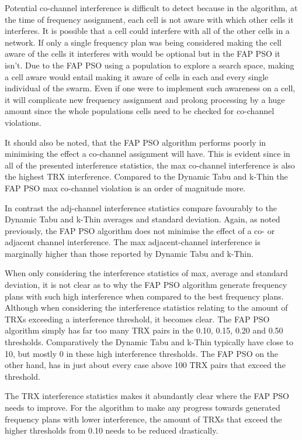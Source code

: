 Potential co-channel interference is difficult to detect because in the algorithm, at the time of frequency assignment, each cell is not aware with which other cells it interferes. It is possible that a cell could interfere with all of the other cells in a network. If only a single frequency plan was being considered making the cell aware of the cells it interferes with would be optional but in the FAP PSO it isn't. Due to the FAP PSO using a population to explore a search space, making a cell aware would entail making it aware of cells in each and every single individual of the swarm. Even if one were to implement such awareness on a cell, it will complicate new frequency assignment and prolong processing by a huge amount since the whole populations cells need to be checked for co-channel violations.

It should also be noted, that the FAP PSO algorithm performs poorly in minimising the effect a co-channel assignment will have. This is evident since in all of the presented interference statistics, the max co-channel interference is also the highest TRX interference. Compared to the Dynamic Tabu and k-Thin the FAP PSO max co-channel violation is an order of magnitude more.

In contrast the adj-channel interference statistics compare favourably to the Dynamic Tabu and k-Thin averages and standard deviation. Again, as noted previously, the FAP PSO algorithm does not minimise the effect of a co- or adjacent channel interference. The max adjacent-channel interference is marginally higher than those reported by Dynamic Tabu and k-Thin.

When only considering the interference statistics of max, average and standard deviation, it is not clear as to why the FAP PSO algorithm generate frequency plans with such high interference when compared to the best frequency plans. Although when considering the interference statistics relating to the amount of TRXs exceeding a interference threshold, it becomes clear. The FAP PSO algorithm simply has far too many TRX pairs in the 0.10, 0.15, 0.20 and 0.50 thresholds. Comparatively the Dynamic Tabu and k-Thin typically have close to 10, but mostly 0 in these high interference thresholds. The FAP PSO on the other hand, has in just about every case above 100 TRX pairs that exceed the threshold.

The TRX interference statistics makes it abundantly clear where the FAP PSO needs to improve. For the algorithm to make any progress towards generated frequency plans with lower interference, the amount of TRXs that exceed the higher thresholds from 0.10 needs to be reduced drastically.

